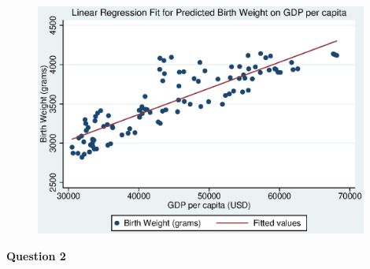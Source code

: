 \documentclass[11pt]{article}
\begin{document}
\begin{figure}[htbp]
\caption{}\label{fig1}
\begin{center}
\includegraphics[height=3in]{graph1.eps}
\end{center}
\end{figure}

\textbf{Question 2}
\end{document}
